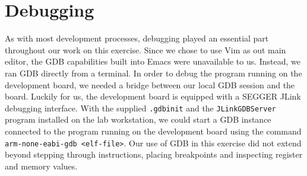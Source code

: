 \section{Debugging}

As with most development processes, debugging played an essential part throughout our work on this exercise. Since we chose to use Vim as out main editor, the GDB capabilities built into Emacs were unavailable to us. Instead, we ran GDB directly from a terminal. In order to debug the program running on the development board, we needed a bridge between our local GDB session and the board. Luckily for us, the development board is equipped with a SEGGER JLink debugging interface. With the supplied \texttt{.gdbinit} and the \texttt{JLinkGDBServer} program installed on the lab workstation, we could start a GDB instance connected to the program running on the development board using the command \texttt{arm-none-eabi-gdb <elf-file>}. Our use of GDB in this exercise did not extend beyond stepping through instructions, placing breakpoints and inspecting register and memory values.
